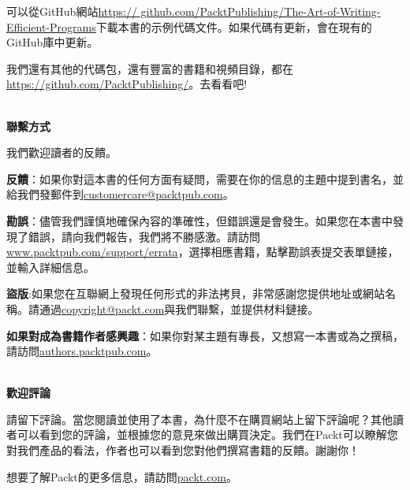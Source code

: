 可以從GitHub網站\url{https://	github.com/PacktPublishing/The-Art-of-Writing-Efficient-Programs}下載本書的示例代碼文件。如果代碼有更新，會在現有的GitHub庫中更新。

我們還有其他的代碼包，還有豐富的書籍和視頻目錄，都在\url{https://github.com/PacktPublishing/}。去看看吧!

\hspace*{\fill} \\ %
\textbf{聯繫方式}

我們歡迎讀者的反饋。

\textbf{反饋}：如果你對這本書的任何方面有疑問，需要在你的信息的主題中提到書名，並給我們發郵件到\url{customercare@packtpub.com}。

\textbf{勘誤}：儘管我們謹慎地確保內容的準確性，但錯誤還是會發生。如果您在本書中發現了錯誤，請向我們報告，我們將不勝感激。請訪問\url{www.packtpub.com/support/errata}，選擇相應書籍，點擊勘誤表提交表單鏈接，並輸入詳細信息。

\textbf{盜版}:如果您在互聯網上發現任何形式的非法拷貝，非常感謝您提供地址或網站名稱。請通過\url{copyright@packt.com}與我們聯繫，並提供材料鏈接。

\textbf{如果對成為書籍作者感興趣}：如果你對某主題有專長，又想寫一本書或為之撰稿，請訪問\url{authors.packtpub.com}。

\hspace*{\fill} \\ %
\textbf{歡迎評論}

請留下評論。當您閱讀並使用了本書，為什麼不在購買網站上留下評論呢？其他讀者可以看到您的評論，並根據您的意見來做出購買決定。我們在Packt可以瞭解您對我們產品的看法，作者也可以看到您對他們撰寫書籍的反饋。謝謝你！

想要了解Packt的更多信息，請訪問\url{packt.com}。










